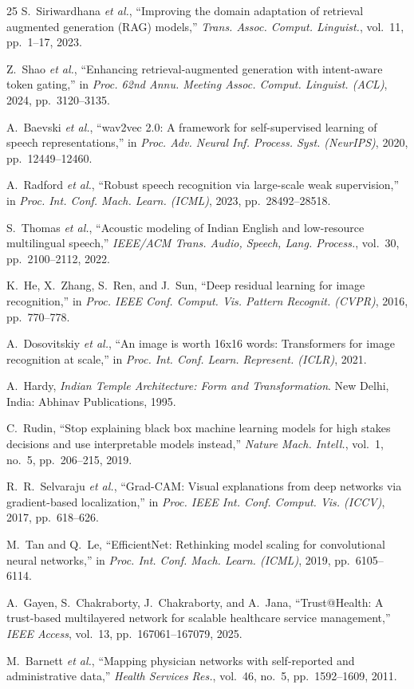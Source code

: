 \documentclass[lettersize,journal]{IEEEtran}
\begin{document}
\begin{thebibliography}{25}
S.~Siriwardhana \textit{et al.}, ``Improving the domain adaptation of retrieval augmented generation (RAG) models,'' \textit{Trans. Assoc. Comput. Linguist.}, vol.~11, pp.~1--17, 2023.

Z.~Shao \textit{et al.}, ``Enhancing retrieval-augmented generation with intent-aware token gating,'' in \textit{Proc. 62nd Annu. Meeting Assoc. Comput. Linguist. (ACL)}, 2024, pp.~3120--3135.

A.~Baevski \textit{et al.}, ``wav2vec 2.0: A framework for self-supervised learning of speech representations,'' in \textit{Proc. Adv. Neural Inf. Process. Syst. (NeurIPS)}, 2020, pp.~12449--12460.

A.~Radford \textit{et al.}, ``Robust speech recognition via large-scale weak supervision,'' in \textit{Proc. Int. Conf. Mach. Learn. (ICML)}, 2023, pp.~28492--28518.

S.~Thomas \textit{et al.}, ``Acoustic modeling of Indian English and low-resource multilingual speech,'' \textit{IEEE/ACM Trans. Audio, Speech, Lang. Process.}, vol.~30, pp.~2100--2112, 2022.

K.~He, X.~Zhang, S.~Ren, and J.~Sun, ``Deep residual learning for image recognition,'' in \textit{Proc. IEEE Conf. Comput. Vis. Pattern Recognit. (CVPR)}, 2016, pp.~770--778.

A.~Dosovitskiy \textit{et al.}, ``An image is worth 16x16 words: Transformers for image recognition at scale,'' in \textit{Proc. Int. Conf. Learn. Represent. (ICLR)}, 2021.

A.~Hardy, \textit{Indian Temple Architecture: Form and Transformation}. New Delhi, India: Abhinav Publications, 1995.

C.~Rudin, ``Stop explaining black box machine learning models for high stakes decisions and use interpretable models instead,'' \textit{Nature Mach. Intell.}, vol.~1, no.~5, pp.~206--215, 2019.

R.~R.~Selvaraju \textit{et al.}, ``Grad-CAM: Visual explanations from deep networks via gradient-based localization,'' in \textit{Proc. IEEE Int. Conf. Comput. Vis. (ICCV)}, 2017, pp.~618--626.

M.~Tan and Q.~Le, ``EfficientNet: Rethinking model scaling for convolutional neural networks,'' in \textit{Proc. Int. Conf. Mach. Learn. (ICML)}, 2019, pp.~6105--6114.

A.~Gayen, S.~Chakraborty, J.~Chakraborty, and A.~Jana, ``Trust@Health: A trust-based multilayered network for scalable healthcare service management,'' \textit{IEEE Access}, vol.~13, pp.~167061--167079, 2025.

M.~Barnett \textit{et al.}, ``Mapping physician networks with self-reported and administrative data,'' \textit{Health Services Res.}, vol.~46, no.~5, pp.~1592--1609, 2011.
\end{thebibliography}
\end{document}
